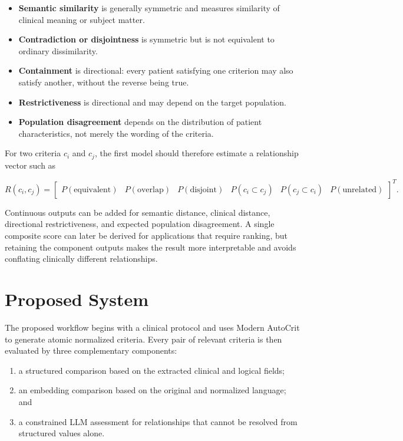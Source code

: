 \documentclass[11pt]{article}
\begin{document}
\begin{itemize}
    \item \textbf{Semantic similarity} is generally symmetric and measures similarity of clinical meaning or subject matter.
    \item \textbf{Contradiction or disjointness} is symmetric but is not equivalent to ordinary dissimilarity.
    \item \textbf{Containment} is directional: every patient satisfying one criterion may also satisfy another, without the reverse being true.
    \item \textbf{Restrictiveness} is directional and may depend on the target population.
    \item \textbf{Population disagreement} depends on the distribution of patient characteristics, not merely the wording of the criteria.
\end{itemize}

For two criteria $c_i$ and $c_j$, the first model should therefore estimate a relationship vector such as

\[
R(c_i,c_j)=
\begin{bmatrix}
P(\text{equivalent}) &
P(\text{overlap}) &
P(\text{disjoint}) &
P(c_i\subset c_j) &
P(c_j\subset c_i) &
P(\text{unrelated})
\end{bmatrix}^{\!T}.
\]

Continuous outputs can be added for semantic distance, clinical distance, directional restrictiveness, and expected population disagreement. A single composite score can later be derived for applications that require ranking, but retaining the component outputs makes the result more interpretable and avoids conflating clinically different relationships.

\section{Proposed System}

The proposed workflow begins with a clinical protocol and uses Modern AutoCrit to generate atomic normalized criteria. Every pair of relevant criteria is then evaluated by three complementary components:

\begin{enumerate}
    \item a structured comparison based on the extracted clinical and logical fields;
    \item an embedding comparison based on the original and normalized language; and
    \item a constrained LLM assessment for relationships that cannot be resolved from structured values alone.
\end{enumerate}
\end{document}
